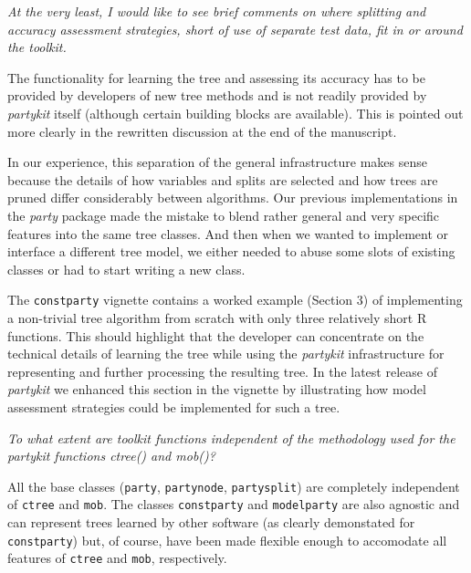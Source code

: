 \documentclass{article}
\begin{document}
\textit{%
At the very least, I would like to see brief comments on where splitting and
accuracy assessment strategies, short of use of separate test data, fit in
or around the toolkit.
}

\smallskip

The functionality for learning the tree and assessing its accuracy has to
be provided by developers of new tree methods and is not readily provided
by \emph{partykit} itself (although certain building blocks are available).
This is pointed out more clearly in the rewritten discussion at the end of
the manuscript.

In our experience, this separation of the general infrastructure makes sense
because the details of how variables and splits are selected and how trees are
pruned differ considerably between algorithms. Our previous implementations
in the \emph{party} package made the mistake to blend rather general and very
specific features into the same tree classes. And then when we wanted to implement or
interface a different tree model, we either needed to abuse some slots of existing
classes or had to start writing a new class.

The \texttt{constparty} vignette contains a worked example (Section 3) of
implementing a non-trivial tree algorithm from scratch with only three
relatively short \textsf{R} functions. This should highlight that the
developer can concentrate on the technical details of learning
the tree while using the \emph{partykit} infrastructure for representing and
further processing the resulting tree. In the latest release of \emph{partykit}
we enhanced this section in the vignette by illustrating how model
assessment strategies could be implemented for such a tree.

\medskip

\textit{To what extent are toolkit functions independent of
the methodology used for the partykit functions ctree() and mob()?}

\smallskip

All the base classes (\texttt{party}, \texttt{partynode}, \texttt{partysplit}) are
completely independent of \texttt{ctree} and \texttt{mob}. The classes
\texttt{constparty} and \texttt{modelparty} are also agnostic and can represent
trees learned by other software (as clearly demonstated for \texttt{constparty})
but, of course, have been made flexible enough to accomodate all features
of \texttt{ctree} and \texttt{mob}, respectively.

\medskip
\end{document}
